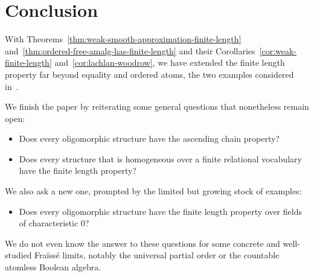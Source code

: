 \section{Conclusion}
With Theorems~\ref{thm:weak-smooth-approximation-finite-length} and~\ref{thm:ordered-free-amalg-has-finite-length} and their Corollaries~\ref{cor:weak-finite-length} and~\ref{cor:lachlan-woodrow}, 
we have extended the finite length property far beyond equality and ordered atoms, the two examples considered in~\cite{BFKM24}. 

We finish the paper by reiterating some general questions that nonetheless remain open:
\begin{itemize}
    \item \cite[Q.~2]{CaminaEvans_91}
    Does every oligomorphic structure have the ascending chain property? 
    
    \item \cite[Q.~1.4]{Evans_pm1}
    Does every structure that is homogeneous over a finite relational vocabulary have the finite length property?
\end{itemize}
We also ask a new one, prompted by the limited but growing stock of examples: 
\begin{itemize}
    \item 
    Does every oligomorphic structure have the finite length property over fields of characteristic $0$?
\end{itemize}
We do not even know the answer to these questions for some concrete and well-studied Fraïssé limits, 
notably the universal partial order or the countable atomless Boolean algebra.
